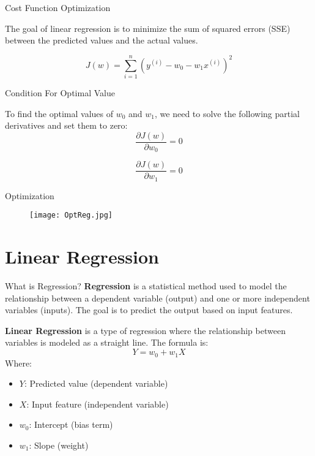 \documentclass[serif, aspectratio=169]{beamer}
\begin{document}
\begin{frame}{Cost Function Optimization}
    \item The goal of linear regression is to minimize the sum of squared errors (SSE) between the predicted values and the actual values.
    
    \begin{equation}
    J(w) = \sum_{i=1}^{n} \left( y^{(i)} - w_0 - w_1 x^{(i)} \right)^2
    \end{equation}
\end{frame}

\begin{frame}{Condition For Optimal Value}
    \item To find the optimal values of $w_0$ and $w_1$, we need to solve the following partial derivatives and set them to zero:
    \begin{equation}
    \frac{\partial J(w)}{\partial w_0} = 0
    \end{equation}

    \begin{equation}
    \frac{\partial J(w)}{\partial w_1} = 0
    \end{equation}
\end{frame}

\begin{frame}{Optimization}
    \begin{figure}[h]
        \centering
        \texttt{[image: OptReg.jpg]} 
    \end{figure}
\end{frame}

\section{Linear Regression}
\begin{frame}{What is Regression?}
\textbf{Regression} is a statistical method used to model the relationship between a dependent variable (output) and one or more independent variables (inputs). The goal is to predict the output based on input features.

\vspace{0.5cm}
\textbf{Linear Regression} is a type of regression where the relationship between variables is modeled as a straight line. The formula is:
\begin{equation}
Y = w_0 + w_1 X
\end{equation}
Where:
\begin{itemize}
    \item $Y$: Predicted value (dependent variable)
    \item $X$: Input feature (independent variable)
    \item $w_0$: Intercept (bias term)
    \item $w_1$: Slope (weight)
\end{itemize}
\end{frame}
\end{document}
